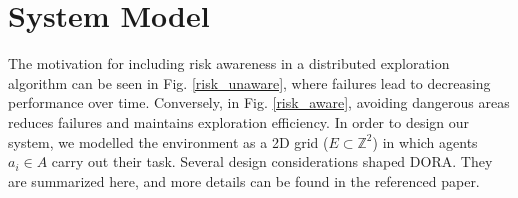 


\section{System Model}
\label{dora_system_model}

The motivation for including risk awareness in a distributed exploration algorithm can be seen in Fig. \ref{risk_unaware}, where failures lead to decreasing performance over time. Conversely, in Fig. \ref{risk_aware}, avoiding dangerous areas reduces failures and maintains exploration efficiency. In order to design our system, we modelled the environment as a 2D grid ($E \subset \mathbb{Z}^2$) in which agents $a_i \in A$ carry out their task. Several design considerations shaped \ac{DORA}. They are summarized here, and more details can be found in the referenced paper.


